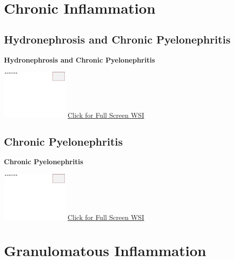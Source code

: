 \documentclass[
  letterpaper,
  paper=6in:9in,
  pagesize=pdftex,
  headinclude=on,
  footinclude=on,
  12pt]{scrbook}
\begin{document}
\hypertarget{sec-chronic-inflammation}{%
\chapter{Chronic Inflammation}\label{sec-chronic-inflammation}}

\hypertarget{sec-hydronephrosis-chronic-pyelonephritis}{%
\section{Hydronephrosis and Chronic
Pyelonephritis}\label{sec-hydronephrosis-chronic-pyelonephritis}}

\textbf{Hydronephrosis and Chronic Pyelonephritis}

\href{https://images.patolojiatlasi.com/template/HE.html}{\includegraphics[width=0.25\textwidth,height=\textheight]{./screenshots/template_screenshot.png}}
\href{https://images.patolojiatlasi.com/chronicpyelonephritis/HE1.html}{Click
for Full Screen WSI}

\hypertarget{sec-chronic-pyelonephritis}{%
\section{Chronic Pyelonephritis}\label{sec-chronic-pyelonephritis}}

\textbf{Chronic Pyelonephritis}

\href{https://images.patolojiatlasi.com/template/HE.html}{\includegraphics[width=0.25\textwidth,height=\textheight]{./screenshots/template_screenshot.png}}
\href{https://images.patolojiatlasi.com/chronic-pyelonephritis/HE.html}{Click
for Full Screen WSI}

\hypertarget{sec-granulamatous-inflammation}{%
\chapter{Granulomatous
Inflammation}\label{sec-granulamatous-inflammation}}
\end{document}

